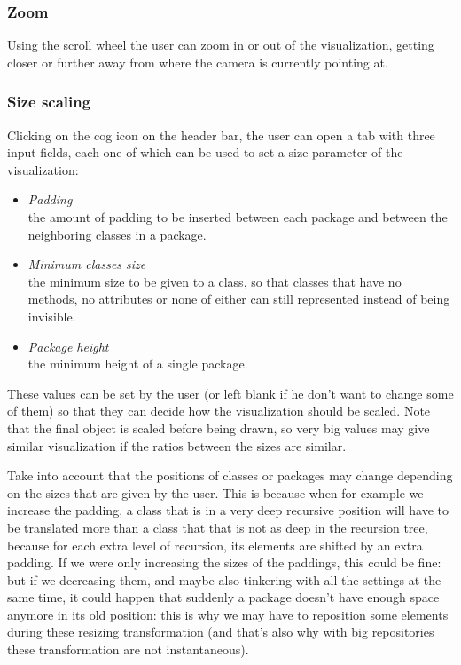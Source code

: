 \documentclass[]{usiinfbachelorproject}
\begin{document}
 \subsubsection{Zoom} \label{Zoom}
Using the scroll wheel the user can zoom in or out of the visualization, getting closer or further away from where the camera is currently pointing at.

\subsubsection{Size scaling} \label{Size scaling}
Clicking on the cog icon on the header bar, the user can open a tab with three input fields, each one of which can be used to set a size parameter of the visualization:

\begin{itemize}
\item \textit{Padding}\\ the amount of padding to be inserted between each package and between the neighboring classes in a package.
\item \textit{Minimum classes size}\\ the minimum size to be given to a class, so that classes that have no methods, no attributes or none of either can still represented instead of being invisible.
\item \textit{Package height}\\ the minimum height of a single package.
\end{itemize}

These values can be set by the user (or left blank if he don't want to change some of them) so that they can decide how the visualization should be scaled. Note that the final object is scaled before being drawn, so very big values may give similar visualization if the ratios between the sizes are similar.

Take into account that the positions of classes or packages may change depending on the sizes that are given by the user. This is because when for example we increase the padding, a class that is in a very deep recursive position will have to be translated more than a class that that is not as deep in the recursion tree, because for each extra level of recursion, its elements are shifted by an extra padding. If we were only increasing the sizes of the paddings, this could be fine: but if we decreasing them, and maybe also tinkering with all the settings at the same time, it could happen that suddenly a package doesn't have enough space anymore in its old position: this is why we may have to reposition some elements during these resizing transformation (and that's also why with big repositories these transformation are not instantaneous).
\end{document}
